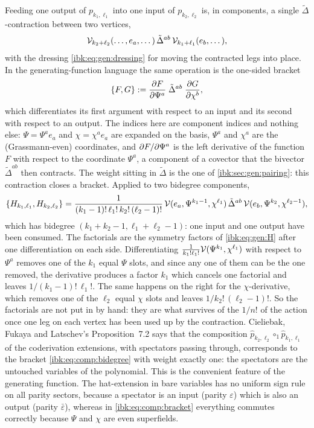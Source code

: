 Feeding one output of $p_{k_1,\ell_1}$ into one input of $p_{k_2,\ell_2}$ is, in components, a single $\tilde\Delta$-contraction between two vertices,
\begin{equation}
  \label{ibk:eq:comp:contraction}
  {\mathcal{V}}_{k_2+\ell_2}(\dots,e_a,\dots)\,\tilde\Delta^{ab}\,{\mathcal{V}}_{k_1+\ell_1}(e_b,\dots),
\end{equation}
with the dressing \eqref{ibk:eq:gen:dressing} for moving the contracted legs into place. In the generating-function language the same operation is the one-sided bracket
\begin{equation}
  \label{ibk:eq:comp:bracket}
  \{F,G\}
    := \frac{\partial F}{\partial\Psi^a}\;\tilde\Delta^{ab}\;\frac{\partial G}{\partial\chi^b},
\end{equation}
which differentiates its first argument with respect to an input and its second with respect to an output. The indices here are component indices and nothing else: $\Psi=\Psi^ae_a$ and $\chi=\chi^ae_a$ are expanded on the basis, $\Psi^a$ and $\chi^a$ are the (Grassmann-even) coordinates, and $\partial F/\partial\Psi^a$ is the left derivative of the function $F$ with respect to the coordinate $\Psi^a$, a component of a covector that the bivector $\tilde\Delta^{ab}$ then contracts. The weight sitting in $\tilde\Delta$ is the one of \cref{ibk:sec:gen:pairing}: this contraction closes a bracket. Applied to two bidegree components,
\begin{equation}
  \label{ibk:eq:comp:bidegree}
  \{H_{k_1,\ell_1},H_{k_2,\ell_2}\}
    = \frac{1}{(k_1-1)!\,\ell_1!\,k_2!\,(\ell_2-1)!}\,
      {\mathcal{V}}(e_a,\Psi^{k_1-1},\chi^{\ell_1})\,\tilde\Delta^{ab}\,{\mathcal{V}}(e_b,\Psi^{k_2},\chi^{\ell_2-1}),
\end{equation}
which has bidegree $(k_1+k_2-1,\ell_1+\ell_2-1)$: one input and one output have been consumed. The factorials are the symmetry factors of \eqref{ibk:eq:gen:H} after one differentiation on each side. Differentiating $\frac{1}{k_1!\ell_1!}{\mathcal{V}}(\Psi^{k_1},\chi^{\ell_1})$ with respect to $\Psi^a$ removes one of the $k_1$ equal $\Psi$ slots, and since any one of them can be the one removed, the derivative produces a factor $k_1$ which cancels one factorial and leaves $1/(k_1-1)!\,\ell_1!$. The same happens on the right for the $\chi$-derivative, which removes one of the $\ell_2$ equal $\chi$ slots and leaves $1/k_2!\,(\ell_2-1)!$. So the factorials are not put in by hand: they are what survives of the $1/n!$ of the action once one leg on each vertex has been used up by the contraction. Cieliebak, Fukaya and Latschev's Proposition~7.2 says that the composition $\hat p_{k_2,\ell_2}\circ_1\hat p_{k_1,\ell_1}$ of the coderivation extensions, with spectators passing through, corresponds to the bracket \eqref{ibk:eq:comp:bidegree} with weight exactly one: the spectators are the untouched variables of the polynomial. This is the convenient feature of the generating function. The hat-extension in bare variables has no uniform sign rule on all parity sectors, because a spectator is an input (parity $\varepsilon$) which is also an output (parity $\bar\varepsilon$), whereas in \eqref{ibk:eq:comp:bracket} everything commutes correctly because $\Psi$ and $\chi$ are even superfields.

